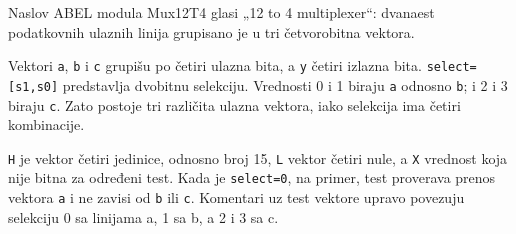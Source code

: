 Naslov ABEL modula Mux12T4 glasi „12 to 4 multiplexer“: dvanaest podatkovnih ulaznih linija grupisano je u tri četvorobitna vektora.

Vektori \texttt{a}, \texttt{b} i \texttt{c} grupišu po četiri ulazna bita, a \texttt{y} četiri izlazna bita. \texttt{select=[s1,s0]} predstavlja dvobitnu selekciju. Vrednosti 0 i 1 biraju \texttt{a} odnosno \texttt{b}; i 2 i 3 biraju \texttt{c}. Zato postoje tri različita ulazna vektora, iako selekcija ima četiri kombinacije.

\texttt{H} je vektor četiri jedinice, odnosno broj 15, \texttt{L} vektor četiri nule, a \texttt{X} vrednost koja nije bitna za određeni test. Kada je \texttt{select=0}, na primer, test proverava prenos vektora \texttt{a} i ne zavisi od \texttt{b} ili \texttt{c}. Komentari uz test vektore upravo povezuju selekciju 0 sa linijama a, 1 sa b, a 2 i 3 sa c.
